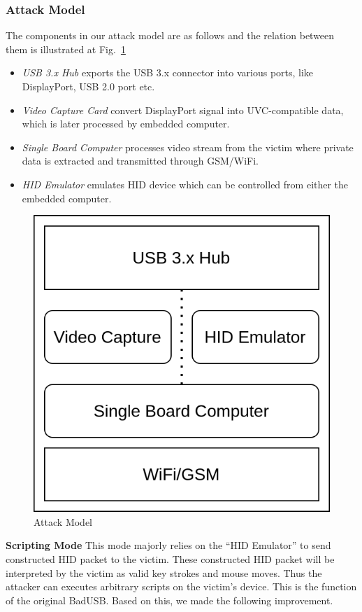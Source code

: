 \subsubsection{Attack Model}
The components in our attack model are as follows and the relation between them is illustrated at Fig.~\ref{fig:attack_model}
\begin{itemize}
	\item\textit{USB 3.x Hub} exports the USB 3.x connector into various ports, like DisplayPort, USB 2.0 port etc.
	\item\textit{Video Capture Card} convert DisplayPort signal into UVC-compatible data, which is later processed by embedded computer.
	\item\textit{Single Board Computer} processes video stream from the victim where private data is extracted and transmitted through GSM/WiFi.
	\item\textit{HID Emulator} emulates HID device which can be controlled from either the embedded computer.
\end{itemize}
\begin{figure}[t]
	\centering
	\includegraphics[width=0.75\linewidth]{./Figs/attack_model.png}
	\caption{Attack Model}
	\label{fig:attack_model}
\end{figure}
\textbf{Scripting Mode} This mode majorly relies on the ``HID Emulator'' to send constructed HID packet to the victim. These constructed HID packet will be interpreted by the victim as valid key strokes and mouse moves. Thus the attacker can executes arbitrary scripts on the victim's device. This is the function of the original BadUSB. Based on this, we made the following improvement.

